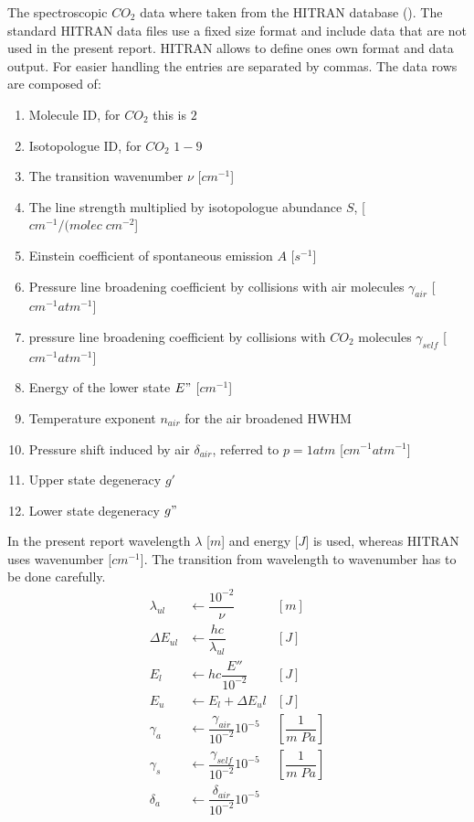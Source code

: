 The spectroscopic $CO_2$ data where taken from the HITRAN database (\cite{hitran1}). The standard HITRAN data files use a fixed size format and include data that are not used in the present report. HITRAN allows to define ones own format and data output. For easier handling the entries are separated by commas. The data rows are composed of: 
\begin{enumerate}
	\item Molecule ID, for $CO_2$ this is $2$			
 	\item Isotopologue ID, for $CO_2$ $1-9$			
 	\item The transition wavenumber $\nu$	[$cm^{-1}$]		
    \item The line strength multiplied by isotopologue abundance $S$, [$cm^{-1}/(molec \;cm^{-2}$]		
 	\item Einstein coefficient of spontaneous emission $A$ [$s^{-1}$]		
 	\item Pressure line broadening coefficient by collisions with air molecules $\gamma_{air}$ [$cm^{-1} atm^{-1}$]		
 	\item pressure line broadening coefficient by collisions with $CO_2$ molecules $\gamma_{self}$ [$cm^{-1} atm^{-1}$]		
	\item Energy of the lower state $E"$ [$cm^{-1}$]		
	\item Temperature exponent $n_{air}$ for the air broadened HWHM			
	\item Pressure shift induced by air $\delta_{air}$, referred to $p = 1 atm$ [$cm^{-1} atm^{-1}$] 		
	\item Upper state degeneracy $g'$			
	\item Lower state degeneracy $g"$
\end{enumerate}
In the present report wavelength $\lambda$ [$m$] and energy [$J$] is used, whereas HITRAN uses wavenumber [$cm^{-1}$]. The transition from wavelength to wavenumber has to be done carefully.  
\begin{align*}
	\lambda_{ul}     & \leftarrow \dfrac{10^{-2}}{\nu}               & [m]                   \\
	\Delta E_{ul}    & \leftarrow \dfrac{h  c}{\lambda_{ul}}         & [J]                   \\
 	E_l              & \leftarrow h  c  \dfrac{E''}{10^{-2}}         & [J]                   \\
	E_u              & \leftarrow E_l + \Delta E_ul                  & [J]                   \\
	\gamma_a         & \leftarrow \dfrac{\gamma_{air}}{10^{-2}}  10^{-5} & \left[\dfrac{1}{m \; Pa}\right] \\
	\gamma_s         & \leftarrow \dfrac{\gamma_{self}}{10^{-2}}  10^{-5} & \left[\dfrac{1}{m \; Pa}\right] \\
	\delta_a         & \leftarrow \dfrac{\delta_{air}}{10^{-2}}  10^{-5} &
\end{align*}

